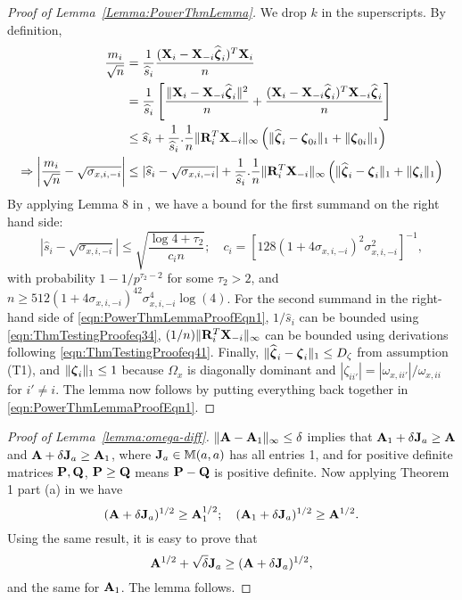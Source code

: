 \begin{proof}[Proof of Lemma~\ref{Lemma:PowerThmLemma}] We drop $k$ in the superscripts. By definition,
\begin{align}
\frac{m_i}{\sqrt n} &= \frac{1}{\widehat s_i} \frac{ ( {\mathbf{X}}_i - {\mathbf{X}}_{-i} \widehat {{\boldsymbol{\zeta}}}_i)^T {\mathbf{X}}_i}{n} \notag\\
&= \frac{1}{\widehat s_i} \left[ \frac{\| {\mathbf{X}}_i - {\mathbf{X}}_{-i} \widehat {{\boldsymbol{\zeta}}}_i \|^2}{n} +
 \frac{({\mathbf{X}}_i - {\mathbf{X}}_{-i} \widehat {{\boldsymbol{\zeta}}}_i)^T {\mathbf{X}}_{-i} \widehat {{\boldsymbol{\zeta}}}_i}{n} \right] \notag\\
& \leq \widehat s_i + \frac{1}{\widehat s_i} .\frac{1}{n} \| {\mathbf{R}}_i^T {\mathbf{X}}_{-i} \|_\infty
\left (\| \widehat {{\boldsymbol{\zeta}}}_i - {\boldsymbol{\zeta}}_{0i} \|_1 + \| {\boldsymbol{\zeta}}_{0i} \|_1 \right) \notag\\
\Rightarrow \left| \frac{m_i}{\sqrt n} - \sqrt{\sigma_{x,i,-i}} \right| & \leq
| \widehat s_i - \sqrt{\sigma_{x,i,-i}} | + \frac{1}{\widehat s_i} .\frac{1}{n} \| {\mathbf{R}}_i^T {\mathbf{X}}_{-i} \|_\infty
\left (\| \widehat {{\boldsymbol{\zeta}}}_i - {\boldsymbol{\zeta}}_{i} \|_1 + \| {\boldsymbol{\zeta}}_{i} \|_1 \right) \label{eqn:PowerThmLemmaProofEqn1}
\end{align}
%
By applying Lemma 8 in \cite{RavikumarEtal11}, we have a bound for the first summand on the right hand side:
%
$$
| \widehat s_i - \sqrt{\sigma_{x,i,-i}} | \leq \sqrt{ \frac{ \log 4 + \tau_2}{c_i n}}; \quad
c_i = \left[ 128 (1 + 4 \sigma_{x,i,-i})^2 \sigma_{x,i,-i}^2 \right]^{-1},
$$
%
with probability $1 - 1/p^{\tau_2 - 2}$ for some $\tau_2>2$, and $n \geq 512 (1 + 4 \sigma_{x,i,-i})^42 \sigma_{x,i,-i}^4 \log(4) $. For the second summand in the right-hand side of \eqref{eqn:PowerThmLemmaProofEqn1}, $1/\widehat s_i$ can be bounded using \eqref{eqn:ThmTestingProofeq34}, $(1/n) \| {\mathbf{R}}_i^T {\mathbf{X}}_{-i} \|_\infty$ can be bounded using derivations following \eqref{eqn:ThmTestingProofeq41}. Finally, $\| \widehat {{\boldsymbol{\zeta}}}_i - {\boldsymbol{\zeta}}_{i} \|_1 \leq D_\zeta$ from assumption (T1), and $\| {\boldsymbol{\zeta}}_i \|_1 \leq 1$ because $\Omega_x$ is diagonally dominant and $|\zeta_{ii'}| = |\omega_{x,ii'}|/ \omega_{x,ii}$ for $i' \neq i$. The lemma now follows by putting everything back together in \eqref{eqn:PowerThmLemmaProofEqn1}.
\end{proof}

\begin{proof}[Proof of Lemma~\ref{lemma:omega-diff}]
$\| {\mathbf{A}} - {\mathbf{A}}_1 \|_\infty \leq \delta$ implies that ${\mathbf{A}}_1 + \delta {\mathbf{J}}_a \geq {\mathbf{A}}$ and ${\mathbf{A}} + \delta {\mathbf{J}}_a \geq {\mathbf{A}}_1$, where ${\mathbf{J}}_a \in {\mathbb{M}}(a,a)$ has all entries 1, and for positive definite matrices ${\mathbf{P}}, {\mathbf{Q}}$, ${\mathbf{P}} \geq {\mathbf{Q}}$ means ${\mathbf{P}} - {\mathbf{Q}}$ is positive definite. Now applying Theorem 1 part (a) in \cite{Bellman68} we have
%
$$
({\mathbf{A}} + \delta {\mathbf{J}}_a)^{1/2} \geq {\mathbf{A}}_1^{1/2}; \quad
({\mathbf{A}}_1 + \delta {\mathbf{J}}_a)^{1/2} \geq {\mathbf{A}}^{1/2}.
$$
%
Using the same result, it is easy to prove that
%
$$ {\mathbf{A}}^{1/2} + \sqrt \delta {\mathbf{J}}_a \geq ({\mathbf{A}} + \delta {\mathbf{J}}_a)^{1/2}, $$
%
and the same for ${\mathbf{A}}_1$. The lemma follows.
\end{proof}


